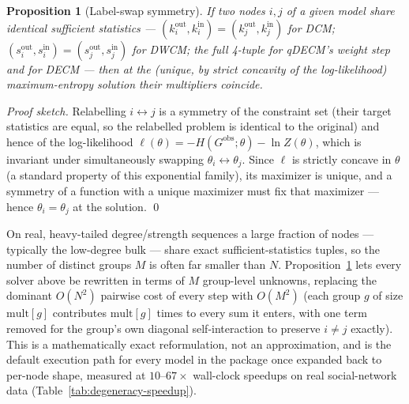 \documentclass[10pt]{article}
\newtheorem{proposition}{Proposition}
\begin{document}
\begin{proposition}[Label-swap symmetry]
\label{prop:degeneracy}
If two nodes $i,j$ of a given model share identical sufficient statistics
--- $(k^{\mathrm{out}}_i,k^{\mathrm{in}}_i)=(k^{\mathrm{out}}_j,k^{\mathrm{in}}_j)$
for DCM; $(s^{\mathrm{out}}_i,s^{\mathrm{in}}_i)=(s^{\mathrm{out}}_j,s^{\mathrm{in}}_j)$
for DWCM; the full 4-tuple for qDECM's weight step and for DECM --- then at
the (unique, by strict concavity of the log-likelihood) maximum-entropy
solution their multipliers coincide.
\end{proposition}
\begin{proof}[Proof sketch]
Relabelling $i\leftrightarrow j$ is a symmetry of the constraint set (their
target statistics are equal, so the relabelled problem is identical to the
original) and hence of the log-likelihood $\ell(\theta) = -H(G^{\mathrm{obs}};\theta)
- \ln Z(\theta)$, which is invariant under simultaneously swapping
$\theta_i\leftrightarrow\theta_j$. Since $\ell$ is strictly concave in
$\theta$ (a standard property of this exponential family), its maximizer
is unique, and a symmetry of a function with a unique maximizer must fix
that maximizer --- hence $\theta_i=\theta_j$ at the solution.
\qed
\end{proof}
On real, heavy-tailed degree/strength sequences a large fraction of nodes
--- typically the low-degree bulk --- share exact sufficient-statistics
tuples, so the number of distinct groups $M$ is often far smaller than
$N$. Proposition~\ref{prop:degeneracy} lets every solver above be rewritten
in terms of $M$ group-level unknowns, replacing the dominant $O(N^2)$
pairwise cost of every step with $O(M^2)$ (each group $g$ of size
$\mathrm{mult}[g]$ contributes $\mathrm{mult}[g]$ times to every sum it
enters, with one term removed for the group's own diagonal
self-interaction to preserve $i\ne j$ exactly). This is a mathematically
exact reformulation, not an approximation, and is the default execution
path for every model in the package once expanded back to per-node shape,
measured at $10$--$67\times$ wall-clock speedups on real social-network
data (Table~\ref{tab:degeneracy-speedup}).
\end{document}
